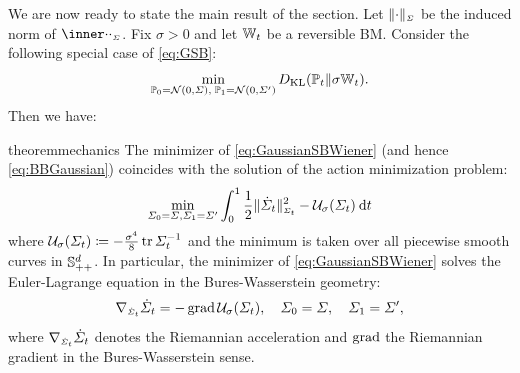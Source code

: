 We are now ready to state the main result of the section. Let $\normBW[\cdot][\Sigma]$ be the induced norm of $\innerBW[\cdot][\cdot][\Sigma]$. Fix $\sigma >0$ and let $\mathbb{W}_{t}$ be a {reversible} \acrlong{BM}. Consider the following special case of \eqref{eq:GSB}:%
\begin{equation}
\label{eq:GaussianSBWiener}
\min_{ \mathbb{P}_{{0}} = \mathcal{N}(0, \Sigma),\; \mathbb{P}_{{1}} = \mathcal{N}(0, \Sigma') } D_{\mathrm{KL}}(\mathbb{P}_{{t}} \| \sigma\mathbb{W}_{t}).
\end{equation}
Then we have:
\begin{restatable}{theorem}{mechanics}
\label{thm:mechanics}
The minimizer of \eqref{eq:GaussianSBWiener} (and hence \eqref{eq:BBGaussian}) coincides with the solution of the action minimization problem:
\begin{align}
\label{eq:LagBW}
\min_{\Sigcurve[0] = \Sigma, \Sigma_\horizon = \Sigma'} \int_{0}^\horizon \LagBW \dt
\end{align}
where $\penergyBW \defeq - \frac{\sigma^4}{8} \tr \Sigcurveinv$ and the minimum is taken over all piecewise smooth curves in $\mathbb{S}_{++}^d$. In particular, the minimizer of \eqref{eq:GaussianSBWiener} solves the Euler-Lagrange equation in the Bures-Wasserstein geometry:
\begin{equation}
\label{eq:el-bw}
\nabla_{\ssstyle\dSigcurve}\dSigcurve = -  \gradBW \penergyBW, \quad \Sigcurve[0] = \Sigma,\quad \Sigcurve[\horizon] = \Sigma',
\end{equation}
where $\nabla_{\scriptscriptstyle\dot{\Sigma}_{t}}\dot{\Sigma}_{t}$ denotes the Riemannian acceleration and $\operatorname{\mathrm{grad}}$ the Riemannian gradient in the Bures-Wasserstein sense.
\end{restatable}

